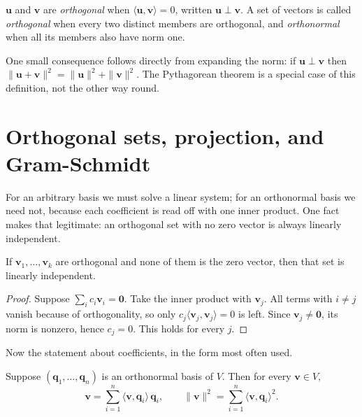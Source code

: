 
\begin{definisi}
$\mathbf{u}$ and $\mathbf{v}$ are \emph{orthogonal} when
$\langle\mathbf{u},\mathbf{v}\rangle=0$, written $\mathbf{u}\perp\mathbf{v}$. A set of
vectors is called \emph{orthogonal} when every two distinct members are orthogonal, and
\emph{orthonormal} when all its members also have norm one.
\end{definisi}

One small consequence follows directly from expanding the norm: if $\mathbf{u}\perp\mathbf{v}$
then $\|\mathbf{u}+\mathbf{v}\|^{2}=\|\mathbf{u}\|^{2}+\|\mathbf{v}\|^{2}$. The
Pythagorean theorem is a special case of this definition, not the other way round.

\section{Orthogonal sets, projection, and Gram-Schmidt}

For an arbitrary basis we must solve a linear system; for an orthonormal basis we need not,
because each coefficient is read off with one inner product. One fact makes that
legitimate: an orthogonal set with no zero vector is always linearly independent.

\begin{lemma}
If $\mathbf{v}_{1},\dots,\mathbf{v}_{k}$ are orthogonal and none of them is the zero vector,
then that set is linearly independent.
\end{lemma}

\begin{proof}
Suppose $\sum_{i}c_{i}\mathbf{v}_{i}=\mathbf{0}$. Take the inner product with
$\mathbf{v}_{j}$. All terms with $i\ne j$ vanish because of orthogonality, so only
$c_{j}\langle\mathbf{v}_{j},\mathbf{v}_{j}\rangle=0$ is left. Since $\mathbf{v}_{j}\ne\mathbf{0}$,
its norm is nonzero, hence $c_{j}=0$. This holds for every $j$.
\end{proof}

Now the statement about coefficients, in the form most often used.

\begin{proposisi}
Suppose $(\mathbf{q}_{1},\dots,\mathbf{q}_{n})$ is an orthonormal basis of $V$. Then for
every $\mathbf{v}\in V$,
\[
  \mathbf{v}=\sum_{i=1}^{n}\langle\mathbf{v},\mathbf{q}_{i}\rangle\,\mathbf{q}_{i},
  \qquad
  \|\mathbf{v}\|^{2}=\sum_{i=1}^{n}\langle\mathbf{v},\mathbf{q}_{i}\rangle^{2}.
\]
\end{proposisi}

